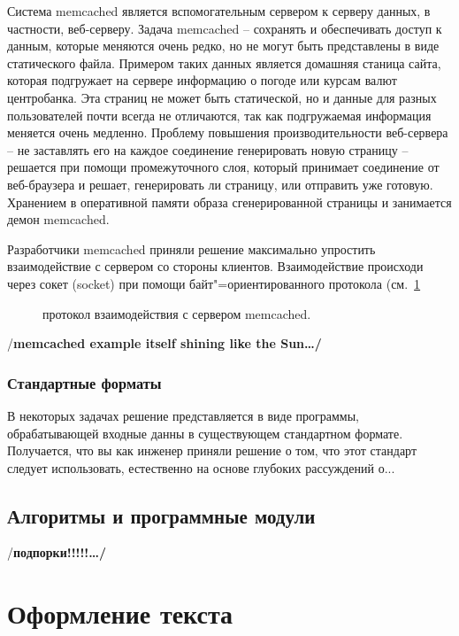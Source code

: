\documentclass[a4paper,14pt,final]{extreport}
\newcommand{\aaa}[1]{{/\bfseries #1\ldots/}}
\begin{document}
Система memcached является вспомогательным сервером к серверу данных, в частности, веб-серверу.  Задача memcached -- сохранять и обеспечивать доступ к данным, которые меняются очень редко, но не могут быть представлены в виде статического файла.  Примером таких данных является домашняя станица сайта, которая подгружает на сервере информацию о погоде или курсам валют центробанка.  Эта страниц не может быть статической, но и данные для разных пользователей почти всегда не отличаются, так как подгружаемая информация меняется очень медленно.  Проблему повышения производительности веб-сервера -- не заставлять его на каждое соединение генерировать новую страницу -- решается при помощи промежуточного слоя, который принимает соединение от веб-браузера и решает, генерировать ли страницу, или отправить уже готовую.  Хранением в оперативной памяти образа сгенерированной страницы и занимается демон memcached.

Разработчики memcached приняли решение максимально упростить взаимодействие с сервером со стороны клиентов.  Взаимодействие происходи через сокет (socket) при помощи байт"=ориентированного протокола (см.~\ref{fig:memcached}
\begin{figure}[hbt]
  \centering

  \caption[Протокол memcached]{протокол взаимодействия с сервером memcached.}
  \label{fig:memcached}
\end{figure}

\aaa{memcached example itself shining like the Sun}


\subsection{Стандартные форматы}
\label{sec:standardformats}

В некоторых задачах решение представляется в виде программы, обрабатывающей входные данны в существующем стандартном формате.  Получается, что вы как инженер приняли решение о том, что этот стандарт следует использовать, естественно на основе глубоких рассуждений о...

\section{Алгоритмы и программные модули}
\label{sec:programmod}



\aaa{подпорки!!!!!}

\chapter{Оформление текста}
\label{cha:layout}
\end{document}

